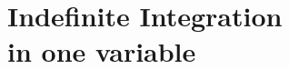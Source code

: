 



\part{Indefinite Integration\\ \quad in one variable}








\printbibliography[title = {Aliquam}]


